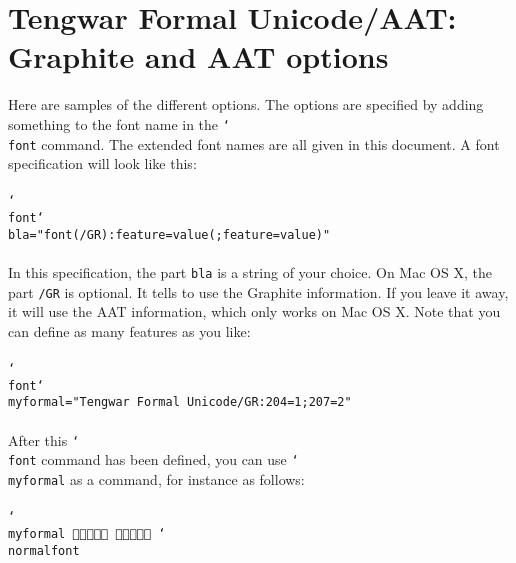 \documentclass[11pt,a4paper]{article}
\begin{document}
\tableofcontents

\section{Tengwar Formal Unicode/AAT: Graphite and AAT options}

Here are samples of the different options. The options are specified by adding something to the font name in the \texttt{\char`\\font} command. The extended font names are all given in this document. A font specification will look like this:

\paragraph{} \texttt{\char`\\font\char`\\bla="font(/GR):feature=value(;feature=value)"}

\paragraph{} In this specification, the part \texttt{bla} is a string of your choice. On Mac OS X, the part \texttt{/GR} is optional. It tells \XeTeX{} to use the Graphite information. If you leave it away, it will use the AAT information, which only works on Mac OS X. Note that you can define as many features as you like:

\paragraph{} \texttt{\char`\\font\char`\\myformal="Tengwar Formal Unicode/GR:204=1;207=2"}

\paragraph{} After this \texttt{\char`\\font} command has been defined, you can use \texttt{\char`\\myformal} as a command, for instance as follows:

\paragraph{} \texttt{\char`\\myformal   \char`\\normalfont}
\end{document}
